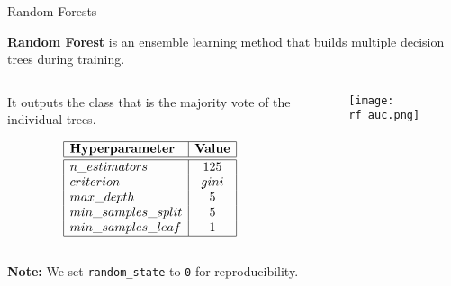 \begin{frame}{Random Forests}

    \textbf{Random Forest} is an ensemble learning method that builds multiple decision trees during training. 

    \begin{columns}
        \begin{column}{0.45\textwidth}
            It outputs the class that is the majority vote of the individual trees.

            \vspace{1em}

            {\small
            $$
            \begin{array}{|l|c|}
                \hline
                \textbf{Hyperparameter} & \textbf{Value} \\
                \hline
                \hline
                n\_estimators & 125 \\
                criterion & gini \\
                max\_depth & 5 \\
                min\_samples\_split & 5 \\
                min\_samples\_leaf & 1 \\
                \hline
            \end{array}
            $$
            }
        \end{column}
        \begin{column}{0.55\textwidth}
            \begin{figure}
                \centering
                \vfill
                \texttt{[image: rf\_auc.png]}
            \end{figure}
        \end{column}
    \end{columns}

        \begin{footnotesize}
            \centering
            \textbf{Note:} We set \texttt{random\_state} to \texttt{0} for reproducibility.
        \end{footnotesize}
\end{frame}

